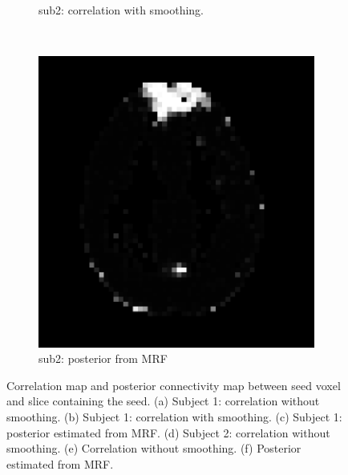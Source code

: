 \begin{figure}[p]
\begin{subfigure}[t]{0.3\textwidth}
    \caption{sub2: correlation with smoothing.}
    \label{fig:invivo25}
    \end{subfigure}
~
  \begin{subfigure}[t]{0.3\textwidth}
    \centering
    \includegraphics[width=\textwidth]{figures/method1/invivo2/R2_mrf}
    \caption{sub2: posterior from MRF}
    \label{fig:invivo26}
    \end{subfigure}
  \caption{Correlation map and posterior connectivity map between seed voxel and
    slice containing the seed. (a) Subject 1: correlation without
    smoothing. (b) Subject 1: correlation with smoothing. (c) Subject 1:
    posterior estimated from MRF. (d) Subject 2: correlation without
    smoothing. (e) Correlation without smoothing. (f) Posterior estimated
    from MRF. }
  \label{fig:invivo2}
\end{figure}


